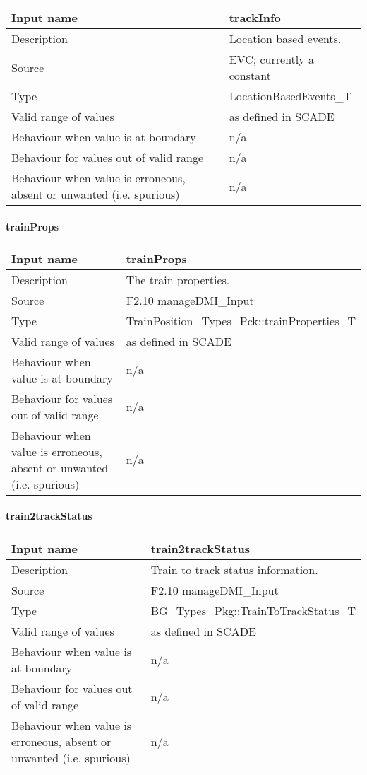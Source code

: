 \begin{longtable}{p{}p{}}
\toprule
Input name				& trackInfo \\
\midrule
Description				& Location based events. \\
\midrule
Source					& EVC; currently a constant \\ 
\midrule
Type					& LocationBasedEvents\_T \\
\midrule
Valid range of values	& as defined in SCADE \\
\midrule
Behaviour when value is at boundary	& n/a \\
\midrule
Behaviour for values out of valid range	& n/a \\
\midrule
Behaviour when value is erroneous, absent or unwanted (i.e. spurious) & n/a \\
\bottomrule
\end{longtable}

\paragraph{trainProps}

\begin{longtable}{p{}p{}}
\toprule
Input name				& trainProps \\
\midrule
Description				& The train properties. \\
\midrule
Source					& F2.10 manageDMI\_Input \\ 
\midrule
Type					& TrainPosition\_Types\_Pck::trainProperties\_T \\
\midrule
Valid range of values	& as defined in SCADE \\
\midrule
Behaviour when value is at boundary	& n/a \\
\midrule
Behaviour for values out of valid range	& n/a \\
\midrule
Behaviour when value is erroneous, absent or unwanted (i.e. spurious) & n/a \\
\bottomrule
\end{longtable}

\paragraph{train2trackStatus}

\begin{longtable}{p{}p{}}
\toprule
Input name				& train2trackStatus \\
\midrule
Description				& Train to track status information. \\
\midrule
Source					& F2.10 manageDMI\_Input \\ 
\midrule
Type					& BG\_Types\_Pkg::TrainToTrackStatus\_T \\
\midrule
Valid range of values	& as defined in SCADE \\
\midrule
Behaviour when value is at boundary	& n/a \\
\midrule
Behaviour for values out of valid range	& n/a \\
\midrule
Behaviour when value is erroneous, absent or unwanted (i.e. spurious) & n/a \\
\bottomrule
\end{longtable}

